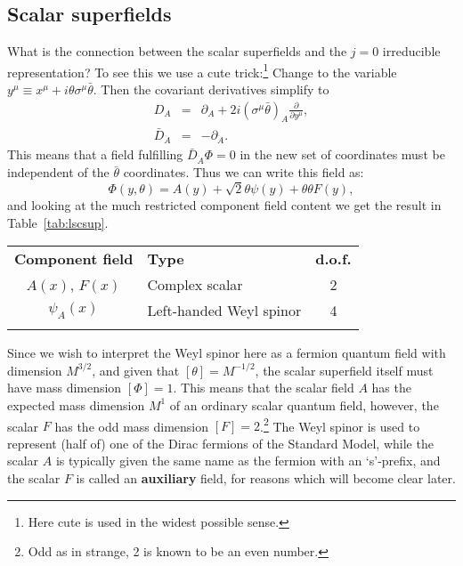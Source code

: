\documentclass[notes.tex]{subfiles}
\begin{document}
\subsection{Scalar superfields}
What is the connection between the scalar superfields and the $j=0$ irreducible representation? To see this we use a cute trick:\footnote{Here cute is used in the widest possible sense.} Change to the variable $y^\mu \equiv x^\mu + i\theta\sigma^\mu \bar{\theta}$. Then the covariant derivatives simplify to
\begin{eqnarray}
D_A &=& \partial_A + 2i(\sigma^\mu\bar{\theta})_{A}\frac{\partial}{\partial y^\mu},\\
\bar{D}_{\dot{A}} &=& -\partial_{\dot{A}}.
\end{eqnarray}
This means that a field fulfilling $\bar{D}_{\dot{A}} \Phi = 0$ in the new set of coordinates must be independent of the $\bar{\theta}$ coordinates. Thus we can write this field as:
\begin{equation}
\Phi(y, \theta) = A(y) + \sqrt{2}\theta\psi(y) + \theta\theta F(y),
\label{eq:leftscalarsuperfield_y}
\end{equation}
and looking at the much restricted component field content we get the result in Table~\ref{tab:lscsup}. 
\begin{center}
   \begin{tabular}{c |l| c} 
   \noalign{\smallskip}\hline\noalign{\smallskip}
   {\bf Component field} & {\bf Type} & {\bf d.o.f.} \\
   \noalign{\smallskip}\hline\noalign{\smallskip}
   $A(x)$, $F(x)$ & Complex scalar & 2\\
   $\psi_A(x)$ & Left-handed Weyl spinor & 4\\
   \noalign{\smallskip}\hline\noalign{\smallskip}
    \end{tabular}
   \end{center}

Since we wish to interpret the Weyl spinor here as a fermion quantum field with dimension $M^{3/2}$, and given that $[\theta]=M^{-1/2}$, the scalar superfield itself must have mass dimension $[\Phi]=1$. This means that the scalar field $A$ has the expected mass dimension $M^1$ of an ordinary scalar quantum field, however, the scalar $F$ has the odd mass dimension $[F]=2$.\footnote{Odd as in strange, 2 is known to be an even number.} The Weyl spinor is used to represent (half of) one of the Dirac fermions of the Standard Model, while the scalar $A$ is typically given the same name as the fermion with an `s'-prefix, and the scalar $F$ is called an {\bf auxiliary} field, for reasons which will become clear later.
\end{document}
